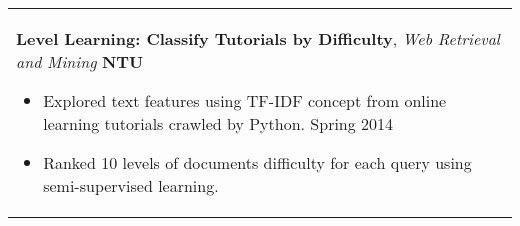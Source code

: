 \documentclass[a4paper,11pt]{article} %
\begin{document}
{\begin{tabular}{p{18.5cm}}
{\bf{Level Learning: Classify Tutorials by Difficulty}}, {\it{Web Retrieval and Mining}} \hfill {\bf{NTU}}
\begin{itemize}
\item Explored text features using TF-IDF concept from online learning tutorials crawled by Python. \hfill Spring 2014
\item Ranked 10 levels of documents difficulty for each query using semi-supervised learning.\vspace*{-\baselineskip}
\end{itemize}\\
%
%
%
%
\end{tabular}

}
\end{document}
